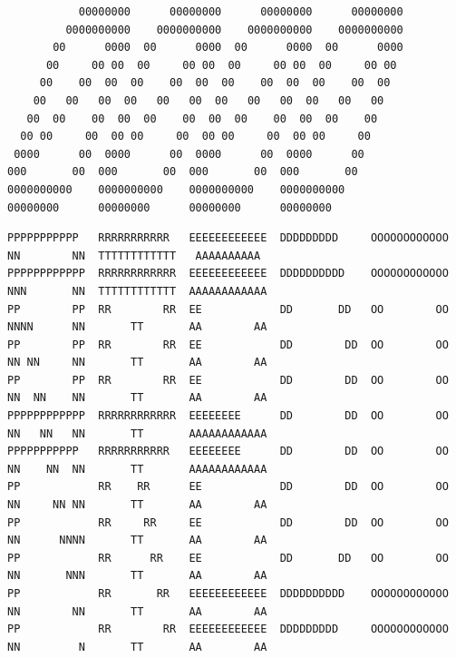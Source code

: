 
{\fontsize{4.1pt}{4.8pt}\selectfont
\begin{verbatim}
           00000000      00000000      00000000      00000000
         0000000000    0000000000    0000000000    0000000000
       00      0000  00      0000  00      0000  00      0000
      00     00 00  00     00 00  00     00 00  00     00 00
     00    00  00  00    00  00  00    00  00  00    00  00
    00   00   00  00   00   00  00   00   00  00   00   00
   00  00    00  00  00    00  00  00    00  00  00    00
  00 00     00  00 00     00  00 00     00  00 00     00
 0000      00  0000      00  0000      00  0000      00
000       00  000       00  000       00  000       00
0000000000    0000000000    0000000000    0000000000
00000000      00000000      00000000      00000000
\end{verbatim}
}

{\fontsize{4.1pt}{4.8pt}\selectfont
\begin{verbatim}
PPPPPPPPPPP   RRRRRRRRRRR   EEEEEEEEEEEE  DDDDDDDDD     OOOOOOOOOOOO  NN        NN  TTTTTTTTTTTT   AAAAAAAAAA
PPPPPPPPPPPP  RRRRRRRRRRRR  EEEEEEEEEEEE  DDDDDDDDDD    OOOOOOOOOOOO  NNN       NN  TTTTTTTTTTTT  AAAAAAAAAAAA
PP        PP  RR        RR  EE            DD       DD   OO        OO  NNNN      NN       TT       AA        AA
PP        PP  RR        RR  EE            DD        DD  OO        OO  NN NN     NN       TT       AA        AA
PP        PP  RR        RR  EE            DD        DD  OO        OO  NN  NN    NN       TT       AA        AA
PPPPPPPPPPPP  RRRRRRRRRRRR  EEEEEEEE      DD        DD  OO        OO  NN   NN   NN       TT       AAAAAAAAAAAA
PPPPPPPPPPP   RRRRRRRRRRR   EEEEEEEE      DD        DD  OO        OO  NN    NN  NN       TT       AAAAAAAAAAAA
PP            RR    RR      EE            DD        DD  OO        OO  NN     NN NN       TT       AA        AA
PP            RR     RR     EE            DD        DD  OO        OO  NN      NNNN       TT       AA        AA
PP            RR      RR    EE            DD       DD   OO        OO  NN       NNN       TT       AA        AA
PP            RR       RR   EEEEEEEEEEEE  DDDDDDDDDD    OOOOOOOOOOOO  NN        NN       TT       AA        AA
PP            RR        RR  EEEEEEEEEEEE  DDDDDDDDD     OOOOOOOOOOOO  NN         N       TT       AA        AA
\end{verbatim}
}

